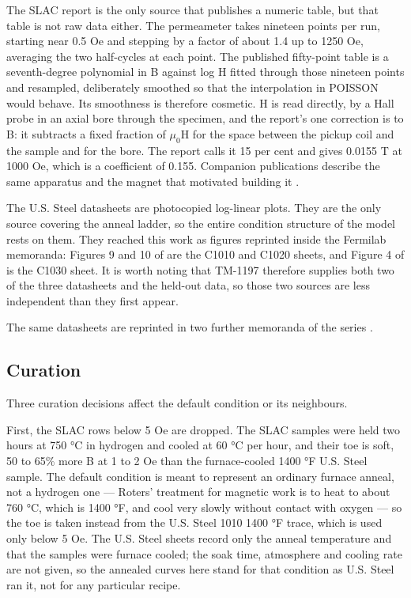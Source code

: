 \documentclass[
  11pt,
]{article}
\begin{document}
The SLAC report is the only source that publishes a numeric table, but that table is not raw data either. The permeameter takes nineteen points per run, starting near 0.5 Oe and stepping by a factor of about 1.4 up to 1250 Oe, averaging the two half-cycles at each point. The published fifty-point table is a seventh-degree polynomial in B against log H fitted through those nineteen points and resampled, deliberately smoothed so that the interpolation in POISSON would behave. Its smoothness is therefore cosmetic. H is read directly, by a Hall probe in an axial bore through the specimen, and the report's one correction is to B: it subtracts a fixed fraction of \(\mu_0\)H for the space between the pickup coil and the sample and for the bore. The report calls it 15 per cent and gives 0.0155 T at 1000 Oe, which is a coefficient of 0.155. Companion publications describe the same apparatus \cite{cobb1990} and the magnet that motivated building it \cite{early1989}.

The U.S. Steel datasheets \cite{ito1983,visser1987} are photocopied log-linear plots. They are the only source covering the anneal ladder, so the entire condition structure of the model rests on them. They reached this work as figures reprinted inside the Fermilab memoranda: Figures 9 and 10 of \cite{ito1983} are the C1010 and C1020 sheets, and Figure 4 of \cite{visser1987} is the C1030 sheet. It is worth noting that TM-1197 therefore supplies both two of the three datasheets and the held-out data, so those two sources are less independent than they first appear.

The same datasheets are reprinted in two further memoranda of the series \cite{visser1986,visser1985}.
\subsection{Curation}\label{curation}

Three curation decisions affect the default condition or its neighbours.

First, the SLAC rows below 5 Oe are dropped. The SLAC samples were held two hours at 750 °C in hydrogen and cooled at 60 °C per hour, and their toe is soft, 50 to 65\% more B at 1 to 2 Oe than the furnace-cooled 1400 °F U.S. Steel sample. The default condition is meant to represent an ordinary furnace anneal, not a hydrogen one --- Roters' treatment for magnetic work is to heat to about 760 °C, which is 1400 °F, and cool very slowly without contact with oxygen \cite{roters1941} --- so the toe is taken instead from the U.S. Steel 1010 1400 °F trace, which is used only below 5 Oe. The U.S. Steel sheets record only the anneal temperature and that the samples were furnace cooled; the soak time, atmosphere and cooling rate are not given, so the annealed curves here stand for that condition as U.S. Steel ran it, not for any particular recipe.
\end{document}
